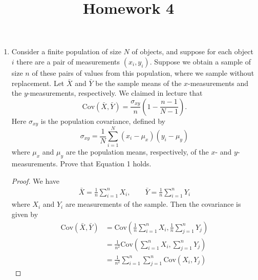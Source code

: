 \documentclass{article}
\newcommand{\cov}{\mathrm{Cov}}
\begin{document}
\title{Homework 4}
\maketitle
\thispagestyle{fancy}

\begin{enumerate}
	\item Consider a finite population of size $N$ of objects, and suppose for each object $i$ there are a pair of measurements $(x_i, y_i).$ Suppose we obtain a sample of size $n$ of these pairs of values from this population, where we sample without replacement. Let $\bar{X}$ and $\bar{Y}$ be the sample means of the $x$-measurements and the $y$-measurements, respectively. We claimed in lecture that \[\tag{1}\cov(\bar{X}, \bar{Y})=\frac{\sigma_{xy}}{n}\left( 1-\frac{n-1}{N-1} \right).\] Here $\sigma_{xy}$ is the population covariance, defined by \[\sigma_{xy}=\frac{1}{N}\sum_{i=1}^{N}(x_i-\mu_x)(y_i-\mu_y)\] where $\mu_x$ and $\mu_y$ are the population means, respectively, of the $x$- and $y$-measurements. Prove that Equation 1 holds.
		\begin{proof}
			We have 
			\begin{align*}
				\bar{X} = \frac{1}{n} \sum_{i=1}^{n} X_i, \quad \quad\bar{Y} = \frac{1}{n} \sum_{i=1}^{n} Y_i
			\end{align*} where $X_i$ and $Y_i$ are measurements of the sample. Then the covariance is given by 
			\begin{align*}
				\cov(\bar{X}, \bar{Y}) &= \cov\left( \frac{1}{n}\sum_{i=1}^{n}X_i, \frac{1}{n}\sum_{j=1}^{n} Y_j \right) \\
				&= \frac{1}{n^2}\cov\left( \sum_{i=1}^{n} X_i, \sum_{j=1}^{n} Y_j \right) \\
				&= \frac{1}{n^2}\sum_{i=1}^{n} \sum_{j=1}^{n} \cov(X_i, Y_j)
			\end{align*} 


\end{proof}
\end{enumerate}
\end{document}
